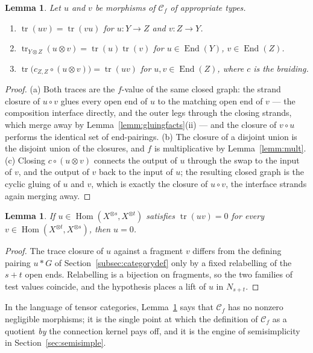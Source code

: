 \documentclass[11pt]{article}
\newtheorem{lemm}[theo]{Lemma}
\newcommand{\glue}{\ast}                          %
\newcommand{\conncat}{\mathcal{C}_{f}}            %
\newcommand{\genX}{X}                             %
\newcommand{\End}{\operatorname{End}}
\newcommand{\Hom}{\operatorname{Hom}}
\newcommand{\tr}{\operatorname{tr}}
\begin{document}
\begin{lemm}\label{lemm:tracecalc}
Let $u$ and $v$ be morphisms of $\conncat$ of appropriate types.
\begin{enumerate}
\item[(a)] $\tr(uv)=\tr(vu)$ for
  $u\colon Y\to Z$ and $v\colon Z\to Y$.
\item[(b)] $\tr_{Y\otimes Z}(u\otimes v)=\tr(u)\tr(v)$ for
  $u\in\End(Y)$, $v\in\End(Z)$.
\item[(c)] $\tr\bigl(c_{Z,Z}\circ(u\otimes v)\bigr)=\tr(uv)$ for
  $u,v\in\End(Z)$, where $c$ is the braiding.
\end{enumerate}
\end{lemm}

\begin{proof}
(a) Both traces are the $f$-value of the same closed graph: the
strand closure of $u\circ v$ glues every open end of $u$ to the
matching open end of $v$ --- the composition interface directly, and
the outer legs through the closing strands, which merge away by
Lemma~\ref{lemm:gluingfacts}(ii) --- and the closure of $v\circ u$
performs the identical set of end-pairings.
(b) The closure of a disjoint union is the disjoint union of the
closures, and $f$ is multiplicative by Lemma~\ref{lemm:mult}.
(c) Closing $c\circ(u\otimes v)$ connects the output of $u$ through
the swap to the input of $v$, and the output of $v$ back to the
input of $u$; the resulting closed graph is the cyclic gluing of $u$
and $v$, which is exactly the closure of $u\circ v$, the
interface strands again merging away.
\end{proof}

\begin{lemm}\label{lemm:negligible}
If $u\in\Hom(\genX^{\otimes s},\genX^{\otimes t})$ satisfies
$\tr(uv)=0$ for every
$v\in\Hom(\genX^{\otimes t},\genX^{\otimes s})$, then $u=0$.
\end{lemm}

\begin{proof}
The trace closure of $u$ against a fragment $v$ differs from the
defining pairing $u\glue G$ of Section~\ref{subsec:categorydef} only
by a fixed relabelling of the $s+t$ open ends. Relabelling is a
bijection on fragments, so the two families of test values coincide,
and the hypothesis places a lift of $u$ in $N_{s+t}$.
\end{proof}

In the language of tensor categories, Lemma~\ref{lemm:negligible}
says that $\conncat$ has no nonzero negligible morphisms; it is the
single point at which the definition of $\conncat$ as a quotient
\emph{by} the connection kernel pays off, and it is the
engine of semisimplicity in Section~\ref{sec:semisimple}.
\end{document}
